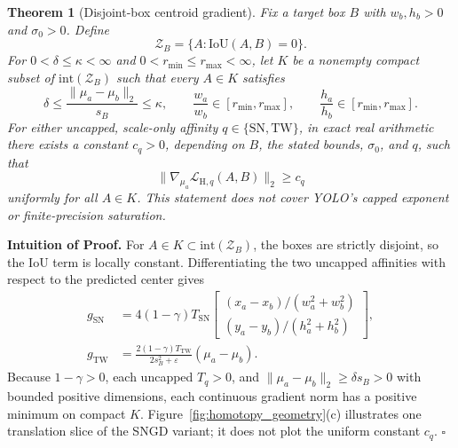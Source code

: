 \documentclass[11pt,a4paper]{article}
\newtheorem{theorem}{Theorem}
\begin{document}
\begin{theorem}[Disjoint-box centroid gradient]
  \label{thm:nonvanishing}
  Fix a target box $B$ with $w_b,h_b>0$ and $\sigma_0>0$. Define
  \begin{equation*}
    \mathcal{Z}_B=\{A:\mathrm{IoU}(A,B)=0\}.
  \end{equation*}
  For $0<\delta\le\kappa<\infty$ and $0<r_{\min}\le r_{\max}<\infty$, let $K$ be a nonempty compact subset of $\mathrm{int}(\mathcal{Z}_B)$ such that every $A\in K$ satisfies
  \begin{equation}
    \delta \le \frac{\|\mu_a - \mu_b\|_2}{s_B} \le \kappa, \qquad
    \frac{w_a}{w_b} \in [r_{\min}, r_{\max}], \qquad
    \frac{h_a}{h_b} \in [r_{\min}, r_{\max}].
  \end{equation}
  For either \emph{uncapped}, scale-only affinity $q\in\{\mathrm{SN},\mathrm{TW}\}$, in exact real arithmetic there exists a constant $c_q > 0$, depending on $B$, the stated bounds, $\sigma_0$, and $q$, such that
  \begin{equation}
    \label{eq:lower_bound}
    \|\nabla_{\mu_a} \mathcal{L}_{\mathrm{H},q}(A, B)\|_2 \ge c_q
  \end{equation}
  uniformly for all $A \in K$. This statement does not cover YOLO's capped exponent or finite-precision saturation.
\end{theorem}

\noindent\textbf{Intuition of Proof.} For $A \in K \subset \mathrm{int}(\mathcal{Z}_B)$, the boxes are strictly disjoint, so the IoU term is locally constant. Differentiating the two uncapped affinities with respect to the predicted center gives
\begin{equation}
  \label{eq:centroid_gradient}
  \begin{aligned}
  g_{\mathrm{SN}} &= 4(1-\gamma)T_{\mathrm{SN}}
  \begin{bmatrix} (x_a-x_b)/(w_a^2+w_b^2) \\ (y_a-y_b)/(h_a^2+h_b^2) \end{bmatrix},\\
  g_{\mathrm{TW}} &= \frac{2(1-\gamma)T_{\mathrm{TW}}}{2s_B^2+\varepsilon}(\mu_a-\mu_b).
  \end{aligned}
\end{equation}
Because $1-\gamma>0$, each uncapped $T_q>0$, and $\|\mu_a-\mu_b\|_2\ge\delta s_B>0$ with bounded positive dimensions, each continuous gradient norm has a positive minimum on compact $K$. Figure~\ref{fig:homotopy_geometry}(c) illustrates one translation slice of the SNGD variant; it does not plot the uniform constant $c_q$. \hfill $\square$
\end{document}
